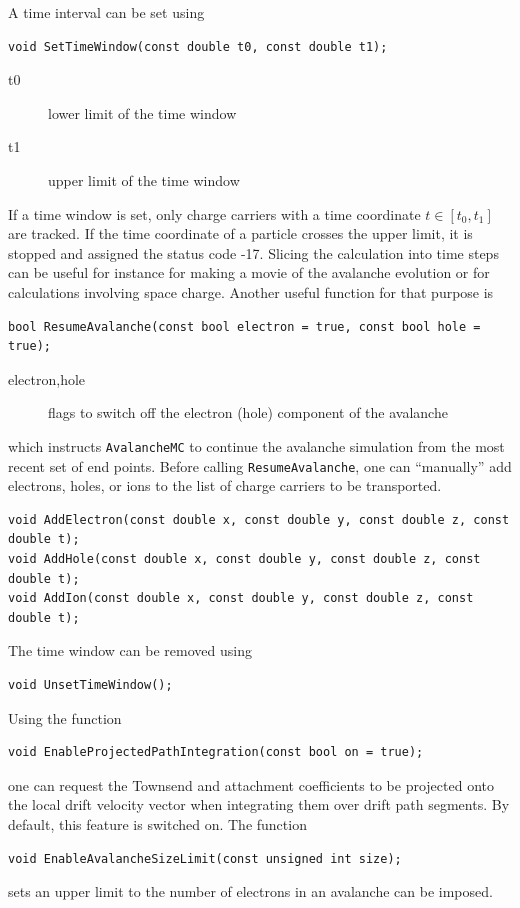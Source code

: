 A time interval can be set using
\begin{lstlisting}
void SetTimeWindow(const double t0, const double t1);
\end{lstlisting}
\begin{description}
  \item[t0] lower limit of the time window
  \item[t1] upper limit of the time window 
\end{description}
If a time window is set, 
only charge carriers with a time coordinate \(t \in \left[t_{0}, t_{1}\right]\) 
are tracked. If the time coordinate of a particle crosses the upper limit, 
it is stopped and assigned the status code -17.
Slicing the calculation into time steps can be useful for instance 
for making a movie of the avalanche evolution 
or for calculations involving space charge. 
Another useful function for that purpose is
\begin{lstlisting}
bool ResumeAvalanche(const bool electron = true, const bool hole = true);
\end{lstlisting}
\begin{description}
  \item[electron,hole] flags to switch off the electron (hole) component of the avalanche
\end{description}
which instructs \texttt{AvalancheMC} to continue the avalanche simulation 
from the most recent set of end points.
Before calling \texttt{ResumeAvalanche}, one can ``manually'' add 
electrons, holes, or ions to the list of charge carriers to be transported. 
\begin{lstlisting}
void AddElectron(const double x, const double y, const double z, const double t); 
void AddHole(const double x, const double y, const double z, const double t); 
void AddIon(const double x, const double y, const double z, const double t); 
\end{lstlisting} 

The time window can be removed using
\begin{lstlisting}
void UnsetTimeWindow();
\end{lstlisting}

Using the function 
\begin{lstlisting}
void EnableProjectedPathIntegration(const bool on = true);
\end{lstlisting} 
one can request the Townsend and attachment coefficients to 
be projected onto the local drift velocity vector when integrating 
them over drift path segments.
By default, this feature is switched on.
The function 
\begin{lstlisting}
void EnableAvalancheSizeLimit(const unsigned int size);
\end{lstlisting}
sets an upper limit to the number of electrons in an avalanche 
can be imposed.

